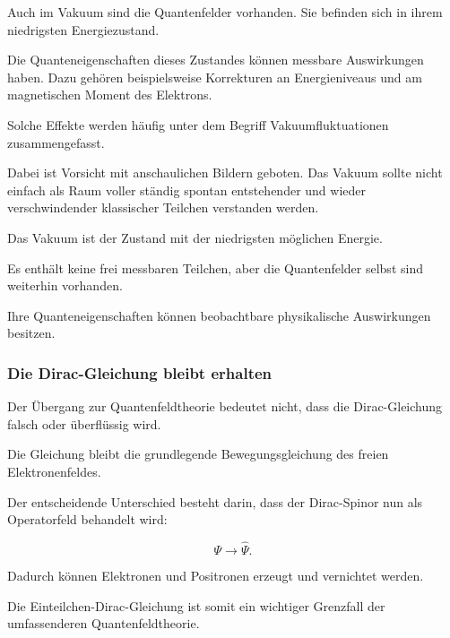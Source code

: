 Auch im Vakuum sind die Quantenfelder vorhanden. Sie befinden sich in
ihrem niedrigsten Energiezustand.

Die Quanteneigenschaften dieses Zustandes können messbare Auswirkungen
haben. Dazu gehören beispielsweise Korrekturen an Energieniveaus und
am magnetischen Moment des Elektrons.

Solche Effekte werden häufig unter dem Begriff
Vakuumfluktuationen zusammengefasst.

Dabei ist Vorsicht mit anschaulichen Bildern geboten. Das Vakuum sollte
nicht einfach als Raum voller ständig spontan entstehender und wieder
verschwindender klassischer Teilchen verstanden werden.

\begin{DidacticBox}
	\label{box:quantenfeldtheoretisches_vakuum}
	
	Das Vakuum ist der Zustand mit der niedrigsten möglichen Energie.
	
	Es enthält keine frei messbaren Teilchen, aber die Quantenfelder selbst
	sind weiterhin vorhanden.
	
	Ihre Quanteneigenschaften können beobachtbare physikalische
	Auswirkungen besitzen.
\end{DidacticBox}

\subsubsection*{Die Dirac-Gleichung bleibt erhalten}

Der Übergang zur Quantenfeldtheorie bedeutet nicht, dass die
Dirac-Gleichung falsch oder überflüssig wird.

Die Gleichung bleibt die grundlegende Bewegungsgleichung des freien
Elektronenfeldes.

Der entscheidende Unterschied besteht darin, dass der Dirac-Spinor nun
als Operatorfeld behandelt wird:

\begin{equation}
	\Psi
	\longrightarrow
	\hat{\Psi}.
\end{equation}

Dadurch können Elektronen und Positronen erzeugt und vernichtet werden.

Die Einteilchen-Dirac-Gleichung ist somit ein wichtiger Grenzfall der
umfassenderen Quantenfeldtheorie.

